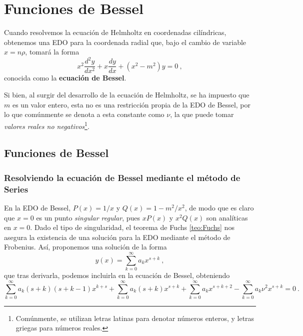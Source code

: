 \chapter{Funciones de Bessel}

Cuando resolvemos la ecuación de Helmholtz en coordenadas cilíndricas, obtenemos una EDO para la coordenada radial que, bajo el cambio de variable $x = n\rho$, tomará la forma
%
\begin{equation}\label{eq:EDO_Bessel}
    x^2 \frac{d^2y}{dx^2} + x \frac{dy}{dx} + (x^2 - m^2) y = 0 \ ,
\end{equation}
conocida como la \textbf{ecuación de Bessel}.

Si bien, al surgir del desarrollo de la ecuación de Helmholtz, se ha impuesto que $m$ es un valor entero, esta no es una restricción propia de la EDO de Bessel, por lo que comúnmente se denota a esta constante como $\nu$, la que puede tomar \emph{valores reales no negativos}\footnote{Comúnmente, se utilizan letras latinas para denotar números enteros, y letras griegas para números reales.}.

\section{Funciones de Bessel}

\subsection{Resolviendo la ecuación de Bessel mediante el método de Series}

En la EDO de Bessel, $P(x) = 1/x$ y $Q(x) = 1- m^2/x^2$, de modo que es claro que $x = 0$ es un punto \emph{singular regular}, pues $x P(x)$ y $x^2 Q(x)$ son analíticas en $x = 0$. Dado el tipo de singularidad, el teorema de Fuchs \ref{teo:Fuchs} nos asegura la existencia de una solución para la EDO mediante el método de Frobenius. Así, proponemos una solución de la forma
%
\begin{equation}\label{eq:solucion_serie_Bessel}
    y(x) = \sum_{k = 0}^\infty a_k x^{s+k} \ ,
\end{equation}
que tras derivarla, podemos incluirla en la ecuación de Bessel, obteniendo
\begin{equation}
    \sum_{k = 0}^\infty a_k (s + k)(s+ k - 1)x^{k + s} + \sum_{k = 0}^\infty a_k (s+k) x^{s+k} + \sum_{k = 0}^\infty a_{k} x^{s+k + 2} - \sum_{k = 0}^\infty a_k \nu^2 x^{s+k} = 0 \ .
\end{equation}

